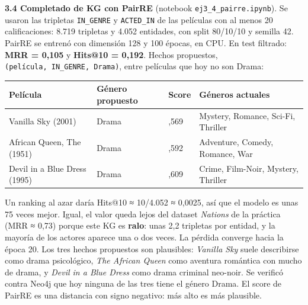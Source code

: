 \documentclass[
  spanish,
  10pt,
]{article}
\newcounter{none} %
\begin{document}
\textbf{3.4 Completado de KG con PairRE} (notebook
\texttt{ej3\_4\_pairre.ipynb}). Se usaron las tripletas
\texttt{IN\_GENRE} y \texttt{ACTED\_IN} de las películas con al menos 20
calificaciones: 8.719 tripletas y 4.052 entidades, con split 80/10/10 y
semilla 42. PairRE se entrenó con dimensión 128 y 100 épocas, en CPU. En
test filtrado: \textbf{MRR = 0,105} y \textbf{Hits@10 = 0,192}. Hechos
propuestos, \texttt{(película,\ IN\_GENRE,\ Drama)}, entre películas que
hoy no son Drama:

{\def\LTcaptype{none} %
\begin{longtable}[]{@{}
  >{\raggedright\arraybackslash}p{}
  >{\raggedright\arraybackslash}p{}
  >{\raggedright\arraybackslash}p{}
  >{\raggedright\arraybackslash}p{}@{}}
\toprule\noalign{}
\begin{minipage}[b]{\linewidth}\raggedright
Película
\end{minipage} & \begin{minipage}[b]{\linewidth}\raggedright
Género propuesto
\end{minipage} & \begin{minipage}[b]{\linewidth}\raggedright
Score
\end{minipage} & \begin{minipage}[b]{\linewidth}\raggedright
Géneros actuales
\end{minipage} \\
\midrule\noalign{}
\endhead
\bottomrule\noalign{}
\endlastfoot
Vanilla Sky (2001) & Drama & -2,569 & Mystery, Romance, Sci-Fi,
Thriller \\
African Queen, The (1951) & Drama & -2,592 & Adventure, Comedy, Romance,
War \\
Devil in a Blue Dress (1995) & Drama & -2,609 & Crime, Film-Noir,
Mystery, Thriller \\
\end{longtable}
}

Un ranking al azar daría Hits@10 ≈ 10/4.052 ≈ 0,0025, así que el modelo
es unas 75 veces mejor. Igual, el valor queda lejos del dataset
\emph{Nations} de la práctica (MRR ≈ 0,73) porque este KG es
\textbf{ralo}: unas 2,2 tripletas por entidad, y la mayoría de los
actores aparece una o dos veces. La pérdida converge hacia la época 20.
Los tres hechos propuestos son plausibles: \emph{Vanilla Sky} suele
describirse como drama psicológico, \emph{The African Queen} como
aventura romántica con mucho de drama, y \emph{Devil in a Blue Dress}
como drama criminal neo-noir. Se verificó contra Neo4j que hoy ninguna
de las tres tiene el género Drama. El score de PairRE es una distancia
con signo negativo: más alto es más plausible.
\end{document}
